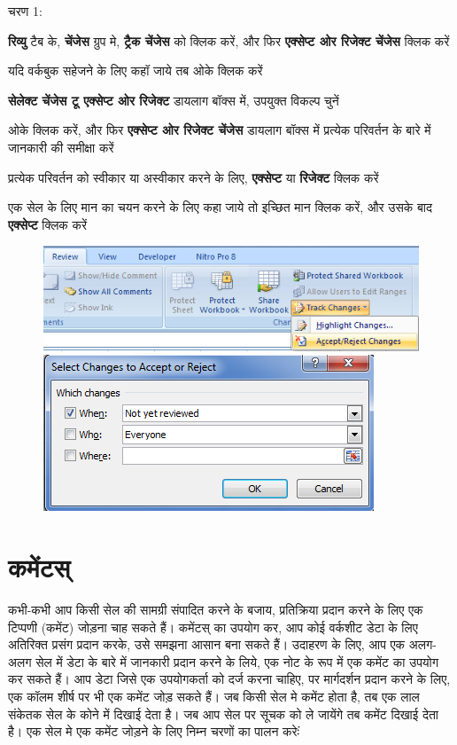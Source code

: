 \begin{descriptionSimple}{चरण 1:}
\item[चरण 1] \textbf{रिव्यु} टैब के, \textbf{चेंजेस} ग्रुप मे, \textbf{ट्रैक चेंजेस} को क्लिक करें, और फिर \textbf{एक्सेप्ट ओर रिजेक्ट चेंजेस} क्लिक करें
\item[चरण 2] यदि वर्कबुक सहेजने के लिए कहॉ जाये तब ओके क्लिक करें
\item[चरण 3] \textbf{सेलेक्ट चेंजेस टू एक्सेप्ट ओर रिजेक्ट} डायलाग बॉक्स में, उपयुक्त विकल्प चुनें
\item[चरण 4] ओके क्लिक करें, और फिर \textbf{एक्सेप्ट ओर रिजेक्ट चेंजेस} डायलाग बॉक्स में प्रत्येक परिवर्तन के बारे में जानकारी की समीक्षा करें
\item[चरण 5] प्रत्येक परिवर्तन को स्वीकार या अस्वीकार करने के लिए, \textbf{एक्सेप्ट} या \textbf{रिजेक्ट} क्लिक करें
\item[चरण 6] एक सेल के लिए मान का चयन करने के लिए कहा जाये तो इच्छित मान क्लिक करें, और उसके बाद \textbf{एक्सेप्ट} क्लिक करें
\end{descriptionSimple}
\begin{figure}[H]
\centering
\includegraphics[scale=0.45]{src/images/chapter1/chapter1_fig71.png}\\[4pt]
\includegraphics[scale=0.45]{src/images/chapter1/chapter1_fig72.png}
\end{figure}								

\section{कमेंटस्}\label{id-1.43}

कभी-कभी आप किसी सेल की सामग्री संपादित करने के बजाय, प्रतिक्रिया प्रदान करने के लिए एक टिप्पणी (कमेंट) जोड़ना चाह सकते हैं। कमेंटस् का उपयोग कर, आप कोई वर्कशीट डेटा के लिए अतिरिक्त प्रसंग प्रदान करके, उसे समझना आसान बना सकते हैं। उदाहरण के लिए, आप एक अलग-अलग सेल में डेटा के बारे में जानकारी प्रदान करने के लिये, एक नोट के रूप में एक कमेंट का उपयोग कर सकते हैं। आप डेटा जिसे एक उपयोगकर्ता को दर्ज करना चाहिए, पर मार्गदर्शन प्रदान करने के लिए, एक कॉलम शीर्ष पर भी एक कमेंट जोड़ सकते हैं। जब किसी सेल मे कमेंट होता है, तब एक लाल संकेतक सेल के कोने में दिखाई देता है। जब आप सेल पर सूचक को ले जायेंगे तब कमेंट दिखाई देता है। एक सेल मे एक कमेंट जोड़ने के लिए निम्न चरणों का पालन करेःं

